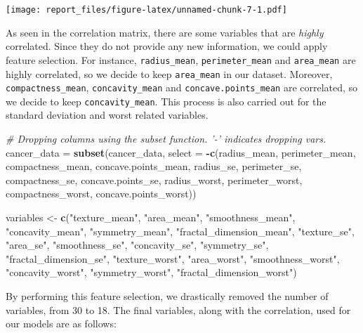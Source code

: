 \documentclass[
]{article}
\newenvironment{Shaded}{\begin{snugshade}}{\end{snugshade}}
\newcommand{\CommentTok}[1]{\textcolor[rgb]{0.56,0.35,0.01}{\textit{#1}}}
\newcommand{\DataTypeTok}[1]{\textcolor[rgb]{0.13,0.29,0.53}{#1}}
\newcommand{\KeywordTok}[1]{\textcolor[rgb]{0.13,0.29,0.53}{\textbf{#1}}}
\newcommand{\NormalTok}[1]{#1}
\newcommand{\OperatorTok}[1]{\textcolor[rgb]{0.81,0.36,0.00}{\textbf{#1}}}
\newcommand{\StringTok}[1]{\textcolor[rgb]{0.31,0.60,0.02}{#1}}
\begin{document}
\texttt{[image: report\_files/figure-latex/unnamed-chunk-7-1.pdf]}

As seen in the correlation matrix, there are some variables that are
\emph{highly} correlated. Since they do not provide any new information,
we could apply feature selection. For instance, \texttt{radius\_mean},
\texttt{perimeter\_mean} and \texttt{area\_mean} are highly correlated,
so we decide to keep \texttt{area\_mean} in our dataset. Moreover,
\texttt{compactness\_mean}, \texttt{concavity\_mean} and
\texttt{concave.points\_mean} are correlated, so we decide to keep
\texttt{concavity\_mean}. This process is also carried out for the
standard deviation and worst related variables.

\begin{Shaded}
\begin{Highlighting}[]
\CommentTok{# Dropping columns using the subset function. '-' indicates dropping vars. }
\NormalTok{cancer_data =}\StringTok{ }\KeywordTok{subset}\NormalTok{(cancer_data, }\DataTypeTok{select =} \OperatorTok{-}\KeywordTok{c}\NormalTok{(radius_mean, perimeter_mean, }
\NormalTok{                     compactness_mean, concave.points_mean, radius_se, }
\NormalTok{                     perimeter_se, compactness_se, concave.points_se, }
\NormalTok{                     radius_worst, perimeter_worst, compactness_worst, }
\NormalTok{                     concave.points_worst))}

\NormalTok{variables <-}\StringTok{ }\KeywordTok{c}\NormalTok{(}\StringTok{"texture_mean"}\NormalTok{, }\StringTok{"area_mean"}\NormalTok{, }\StringTok{"smoothness_mean"}\NormalTok{, }\StringTok{"concavity_mean"}\NormalTok{,}
               \StringTok{"symmetry_mean"}\NormalTok{, }\StringTok{"fractal_dimension_mean"}\NormalTok{, }\StringTok{"texture_se"}\NormalTok{,}
               \StringTok{"area_se"}\NormalTok{, }\StringTok{"smoothness_se"}\NormalTok{, }\StringTok{"concavity_se"}\NormalTok{, }\StringTok{"symmetry_se"}\NormalTok{,}
               \StringTok{"fractal_dimension_se"}\NormalTok{, }\StringTok{"texture_worst"}\NormalTok{, }\StringTok{"area_worst"}\NormalTok{, }
               \StringTok{"smoothness_worst"}\NormalTok{, }\StringTok{"concavity_worst"}\NormalTok{, }\StringTok{"symmetry_worst"}\NormalTok{, }
               \StringTok{"fractal_dimension_worst"}\NormalTok{)}
\end{Highlighting}
\end{Shaded}

By performing this feature selection, we drastically removed the number
of variables, from 30 to 18. The final variables, along with the
correlation, used for our models are as follows:
\end{document}
